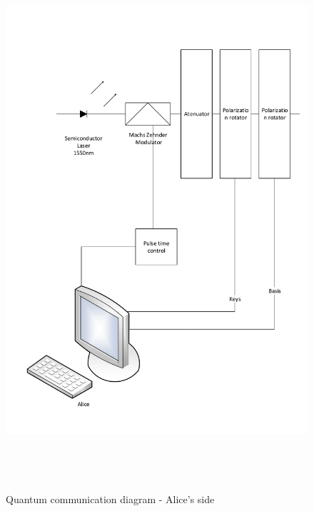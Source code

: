 \begin{figure}[H]
	\centering \includegraphics[width=1.1\textwidth,height=20cm]{./sdf/ot_with_discrete_variables/figures/OT_experimental_alice.pdf}
	\caption{Quantum communication diagram - Alice's side}\label{quantumchannelcommunication1}
\end{figure}

